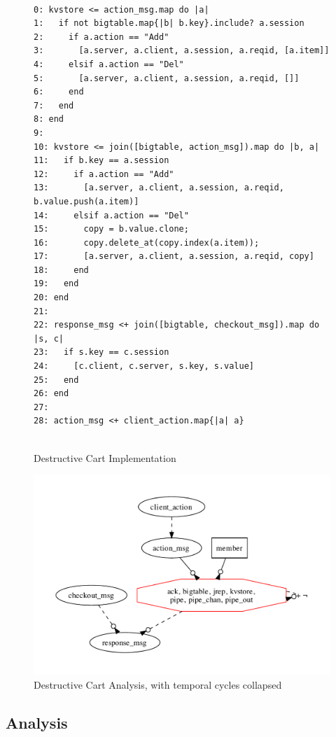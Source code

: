 \begin{figure}[t]
\begin{scriptsize}
\begin{verbatim}

0: kvstore <= action_msg.map do |a|
1:   if not bigtable.map{|b| b.key}.include? a.session
2:     if a.action == "Add"
3:       [a.server, a.client, a.session, a.reqid, [a.item]]
4:     elsif a.action == "Del"
5:       [a.server, a.client, a.session, a.reqid, []]
6:     end
7:   end
8: end
9: 
10: kvstore <= join([bigtable, action_msg]).map do |b, a|
11:   if b.key == a.session
12:     if a.action == "Add"
13:       [a.server, a.client, a.session, a.reqid, b.value.push(a.item)]
14:     elsif a.action == "Del"
15:       copy = b.value.clone;
16:       copy.delete_at(copy.index(a.item));
17:       [a.server, a.client, a.session, a.reqid, copy]
18:     end
19:   end
20: end
21:
22: response_msg <+ join([bigtable, checkout_msg]).map do |s, c|
23:   if s.key == c.session
24:     [c.client, c.server, s.key, s.value]
25:   end
26: end
27: 
28: action_msg <+ client_action.map{|a| a}


\end{verbatim}
\end{scriptsize}
\caption{Destructive Cart Implementation}
\label{fig:pdg-destructive}
\end{figure}

\begin{figure}[t]
\centering
\includegraphics[width=0.9\linewidth]{fig/destructive.pdf}

\caption{Destructive Cart Analysis, with temporal cycles collapsed}
\label{fig:pdg-destructive-analysis}
\end{figure}


\subsection{Analysis}


